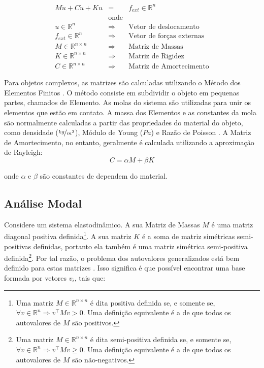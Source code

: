 \begin{eqnarray}
M\ddot{u} + C\dot{u} + Ku &=& f_{ext} \in \mathbb{R}^n \label{elastodynamic} \\
&\text{onde}&\nonumber\\
u \in \mathbb{R}^{n} &\Rightarrow& \text{Vetor de deslocamento} \nonumber\\
f_{ext} \in \mathbb{R}^{n} &\Rightarrow& \text{Vetor de forças externas} \nonumber\\
M \in \mathbb{R}^{n\times n} &\Rightarrow& \text{Matriz de Massas} \nonumber\\
K \in \mathbb{R}^{n\times n} &\Rightarrow& \text{Matriz de Rigidez} \nonumber\\
C \in \mathbb{R}^{n\times n} &\Rightarrow& \text{Matriz de Amortecimento} \nonumber
\end{eqnarray}

Para objetos complexos, as matrizes são calculadas utilizando o Método dos Elementos Finitos \cite{hughes2012finite}. O método consiste em subdividir o objeto em pequenas partes, chamados de Elemento. As molas do sistema são utilizadas para unir os elementos que estão em contato. A massa dos Elementos e as constantes da mola são normalmente calculadas a partir das propriedades do material do objeto, como densidade ($\nicefrac{kg}{m^3}$), Módulo de Young ($Pa$) e Razão de Poisson \cite{shabana2012theory}. A Matriz de Amortecimento, no entanto, geralmente é calculada utilizando a aproximação de Rayleigh:
\begin{equation}
C = \alpha M + \beta{K}
\label{rayleighdamping}
\end{equation}

onde $\alpha$ e $\beta$ são constantes de dependem do material.

\subsection{Análise Modal}

Considere um sistema elastodinâmico. A sua Matriz de Massas $M$ é uma matriz diagonal positiva definida\footnote{Uma matriz $M \in \mathbb{R}^{n\times n}$ é dita positiva definida se, e somente se, $\forall v \in \mathbb{R}^n \Rightarrow v^\intercal M v > 0$. Uma definição equivalente é a de que todos os autovalores de $M$ são positivos.}. A sua matriz $K$ é a soma de matriz simétricas semi-positivas definidas, portanto ela também é uma matriz simétrica semi-positiva definida\footnote{Uma matriz $M \in \mathbb{R}^{n\times n}$ é dita semi-positiva definida se, e somente se, $\forall v \in \mathbb{R}^n \Rightarrow v^\intercal M v \ge 0$. Uma definição equivalente é a de que todos os autovalores de $M$ são não-negativos.}. Por tal razão, o problema dos autovalores generalizados está bem definido para estas matrizes \cite{parlett1980symmetric}. Isso significa é que possível encontrar uma base formada por vetores $v_i$, tais que:

